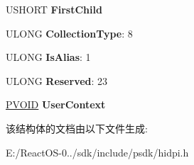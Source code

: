 \begin{DoxyCompactItemize}
U\+S\+H\+O\+RT {\bfseries First\+Child}
\item 
\mbox{\label{struct___h_i_d_p___l_i_n_k___c_o_l_l_e_c_t_i_o_n___n_o_d_e_a290c0f331f3557ca9a1603cb28f77635}} 
U\+L\+O\+NG {\bfseries Collection\+Type}\+: 8
\item 
\mbox{\label{struct___h_i_d_p___l_i_n_k___c_o_l_l_e_c_t_i_o_n___n_o_d_e_a77378e3438b5d00470680c2c6b46ce59}} 
U\+L\+O\+NG {\bfseries Is\+Alias}\+: 1
\item 
\mbox{\label{struct___h_i_d_p___l_i_n_k___c_o_l_l_e_c_t_i_o_n___n_o_d_e_af96bf95d8453541d5c6018eb8b52c96f}} 
U\+L\+O\+NG {\bfseries Reserved}\+: 23
\item 
\mbox{\label{struct___h_i_d_p___l_i_n_k___c_o_l_l_e_c_t_i_o_n___n_o_d_e_a3f732562fe9bc1732c0885883d9a8fd1}} 
\hyperlink{interfacevoid}{P\+V\+O\+ID} {\bfseries User\+Context}
\end{DoxyCompactItemize}


该结构体的文档由以下文件生成\+:\begin{DoxyCompactItemize}
\item 
E\+:/\+React\+O\+S-\/0../sdk/include/psdk/hidpi.\+h\end{DoxyCompactItemize}
